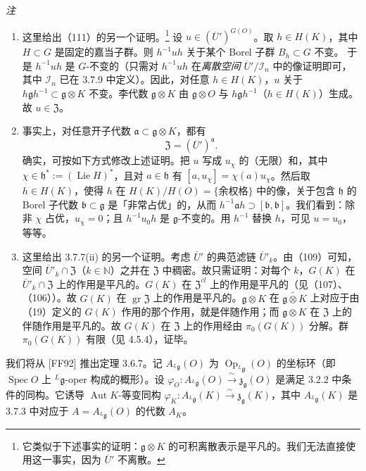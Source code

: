  \emph{注}
\begin{enumerate}[label=(\roman*),leftmargin=2.2em]
\item 这里给出（111）的另一个证明。\footnote{它类似于下述事实的证明：$\mathfrak{g}\otimes K$ 的可积离散表示是平凡的。我们无法直接使用这一事实，因为 $\overline{U}'$ 不离散。} 设 $u\in(\overline{U}')^{G(O)}$。取 $h\in H(K)$，其中 $H\subset G$ 是固定的嘉当子群。则 $h^{-1}uh$ 关于某个 Borel 子群 $B_h\subset G$ 不变。
于是 $h^{-1}uh$ 是 $G$-不变的（只需对 $h^{-1}uh$ 在\emph{离散空间} $\overline{U}'/\mathcal{I}_n$ 中的像证明即可，其中 $\mathcal{I}_n$ 已在 3.7.9 中定义）。因此，对任意 $h\in H(K)$，$u$ 关于 $h\mathfrak{g}h^{-1}\subset\mathfrak{g}\otimes K$ 不变。李代数 $\mathfrak{g}\otimes K$ 由 $\mathfrak{g}\otimes O$ 与 $h\mathfrak{g}h^{-1}$（$h\in H(K)$）生成。故 $u\in\mathfrak{Z}$。
\item 事实上，对任意开子代数 $\mathfrak{a}\subset\mathfrak{g}\otimes K$，都有
\begin{equation}\tag{112}
\mathfrak{Z}=(\overline{U}')^{\mathfrak{a}}.
\end{equation}
确实，可按如下方式修改上述证明。把 $u$ 写成 $u_\chi$ 的（无限）和，其中 $\chi\in\mathfrak{h}^*:=(\operatorname{Lie}H)^*$，且对 $a\in\mathfrak{h}$ 有 $[a,u_\chi]=\chi(a)u_\chi$。然后取 $h\in H(K)$，使得 $h$ 在 $H(K)/H(O)=\{\text{余权格}\}$ 中的像，关于包含 $\mathfrak{h}$ 的 Borel 子代数 $\mathfrak{b}\subset\mathfrak{g}$ 是「非常占优」的，从而 $h^{-1}\mathfrak{a}h\supset[\mathfrak{b},\mathfrak{b}]$。我们看到：除非 $\chi$ 占优，$u_\chi=0$；且 $h^{-1}u_0h$ 是 $\mathfrak{g}$-不变的。用 $h^{-1}$ 替换 $h$，可见 $u=u_0$，等等。
\item 这里给出 3.7.7(ii) 的另一个证明。考虑 $\overline{U}'$ 的典范滤链 $\overline{U}'_k$。由（109）可知，空间 $\overline{U}'_k\cap\mathfrak{Z}$（$k\in\mathbb{N}$）之并在 $\mathfrak{Z}$ 中稠密。故只需证明：对每个 $k$，$G(K)$ 在 $\overline{U}'_k\cap\mathfrak{Z}$ 上的作用是平凡的。$G(K)$ 在 $\mathfrak{Z}^{cl}$ 上的作用是平凡的（见（107）、（106））。故 $G(K)$ 在 $\operatorname{gr}\mathfrak{Z}$ 上的作用是平凡的。$\mathfrak{g}\otimes K$ 在 $\widetilde{\mathfrak{g}\otimes K}$ 上对应于由（19）定义的 $G(K)$ 作用的那个作用，就是伴随作用；而 $\mathfrak{g}\otimes K$ 在 $\mathfrak{Z}$ 上的伴随作用是平凡的。故 $G(K)$ 在 $\mathfrak{Z}$ 上的作用经由 $\pi_0(G(K))$ 分解。群 $\pi_0(G(K))$ 有限（见 4.5.4），证毕。
\end{enumerate}

 我们将从 [FF92] 推出定理 3.6.7。记 $A_{{}^{L}\mathfrak{g}}(O)$ 为 $\operatorname{Op}_{{}^{L}\mathfrak{g}}(O)$ 的坐标环（即 $\operatorname{Spec}O$ 上 ${}^{L}\mathfrak{g}$-oper 构成的概形）。设 $\varphi_O:A_{{}^{L}\mathfrak{g}}(O)\xrightarrow{\ \sim\ }\mathfrak{z}_{\mathfrak{g}}(O)$ 是满足 3.2.2 中条件的同构。它诱导 $\operatorname{Aut}K$-等变同构 $\varphi_K:A_{{}^{L}\mathfrak{g}}(K)\xrightarrow{\ \sim\ }\mathfrak{z}_{\mathfrak{g}}(K)$，其中 $A_{{}^{L}\mathfrak{g}}(K)$ 是 3.7.3 中对应于 $A=A_{{}^{L}\mathfrak{g}}(O)$ 的代数 $A_K$。

